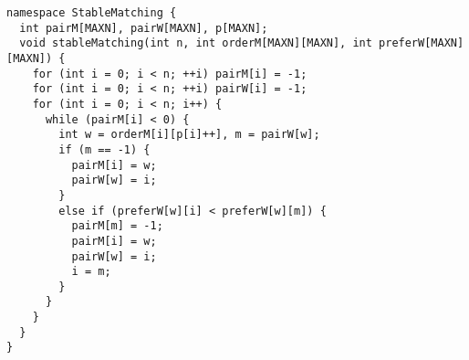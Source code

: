 \begin{lstlisting}
namespace StableMatching {
  int pairM[MAXN], pairW[MAXN], p[MAXN];
  void stableMatching(int n, int orderM[MAXN][MAXN], int preferW[MAXN][MAXN]) {
    for (int i = 0; i < n; ++i) pairM[i] = -1;
    for (int i = 0; i < n; ++i) pairW[i] = -1;
    for (int i = 0; i < n; i++) {
      while (pairM[i] < 0) {
        int w = orderM[i][p[i]++], m = pairW[w];
        if (m == -1) {
          pairM[i] = w;
          pairW[w] = i;
        } 
        else if (preferW[w][i] < preferW[w][m]) {
          pairM[m] = -1;
          pairM[i] = w;
          pairW[w] = i;
          i = m;
        }
      }
    }
  }
}

\end{lstlisting}